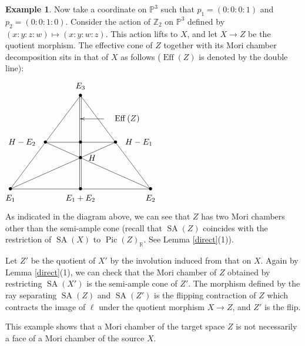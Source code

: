 \documentclass[12pt,twoside]{amsart}
\theoremstyle{definition}
\newtheorem{exmp}[theo]{Example}
\newcommand\SA{\mathop{\mathrm{SA}}\nolimits}
\newcommand\Pic{\mathop{\mathrm{Pic}}\nolimits}
\newcommand\Eff{\mathop{\mathrm{Eff}}\nolimits}
\newcommand\bz{\mathbb{Z}}
\newcommand\br{\mathbb{R}}
\begin{document}
\begin{exmp}
Now take a coordinate on $\mathbb{P}^3$ such that $p_1=(0:0:0:1)$ and $p_2=(0:0:1:0)$. Consider the
action of $\bz_2$ on $\mathbb{P}^3$ defined by $(x:y:z:w)\mapsto (x:y:w:z)$. This action lifts to
$X$, and let $X\to Z$ be the quotient
morphism. The effective cone of $Z$ together with its Mori chamber decomposition
sits in that of $X$ as follows ($\Eff{(Z)}$ is
denoted by the double line):


\vspace{5mm}
$\begin{xy}
(0,0)="A"*{\bullet},
"A"+<6cm,0cm>="B"*{\bullet},
"A"+<3cm,4cm>="C"*{\bullet},
"A"+<1.5cm,2cm>="D"*{\bullet},
"D"+<3cm,0cm>="E"*{\bullet},
"A"+<3cm,1.33333cm>="F"*{\bullet},
"A"+<3cm,0cm>="G"*{\bullet},
"A"+<3cm,2cm>="I"*{\bullet},
(0,-4)="E_1"*{E_1},
"B"+(0,-4)="E_2"*{E_2},
"C"+(0,4)="E_3"*{E_3},
"D"+(-10,0)="H-E_2"*{H-E_2},
"E"+(10,0)="H-E_1"*{H-E_1},
"F"+(5,0)="H"*{H},
"G"+(0,-4)="E_1+E_2"*{E_1+E_2},
"C"+<0cm,-1cm>="T",
"T"+<1cm,0cm>="S",
"S"+(10,0)="Eff{(Z)}"*{\Eff{(Z)}},
\ar"S";"T"
\ar@{-}"A";"B"
\ar@{-}"A";"C"
\ar@{-}"B";"C"
\ar@{-}"A";"E"
\ar@{-}"B";"D"
\ar@{-}"D";"E"
\ar@{=}"G";"C"
\end{xy}$
\vspace{5mm}

As indicated in the diagram above, we can see that $Z$ has two Mori chambers other than
the semi-ample cone (recall that $\SA{(Z)}$ coincides with the restriction of $\SA{(X)}$ to
$\Pic{(Z)}_{\br}$. See Lemma \ref{direct}(1)).

Let $Z'$ be the quotient of $X'$ by the involution induced from that on $X$.
Again by Lemma \ref{direct}(1), we can check that the Mori chamber of $Z$ obtained by restricting $\SA{(X')}$ is the
semi-ample cone of $Z'$. The morphism defined by the ray separating $\SA{(Z)}$ and
$\SA{(Z')}$ is the flipping contraction of $Z$ which contracts the image of $\ell$ under the quotient
morphism $X\to Z$, and $Z'$ is the flip. 

This example shows that a Mori chamber of the target space $Z$ is not necessarily a face of
a Mori chamber of the source $X$.
\end{exmp}

\end{document}
